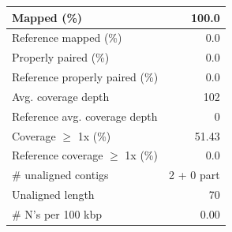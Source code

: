 \documentclass[12pt,a4paper]{article}
\begin{document}
\begin{table}[ht]
\begin{center}
\begin{tabular}{|l*{1}{|r}|}
Mapped (\%) & 100.0 \\ \hline
Reference mapped (\%) & 0.0 \\ \hline
Properly paired (\%) & 0.0 \\ \hline
Reference properly paired (\%) & 0.0 \\ \hline
Avg. coverage depth & 102 \\ \hline
Reference avg. coverage depth & 0 \\ \hline
Coverage $\geq$ 1x (\%) & 51.43 \\ \hline
Reference coverage $\geq$ 1x (\%) & 0.0 \\ \hline
\# unaligned contigs & 2 + 0 part \\ \hline
Unaligned length & 70 \\ \hline
\# N's per 100 kbp & 0.00 \\ \hline
\end{tabular}
\end{center}
\end{table}
\end{document}
